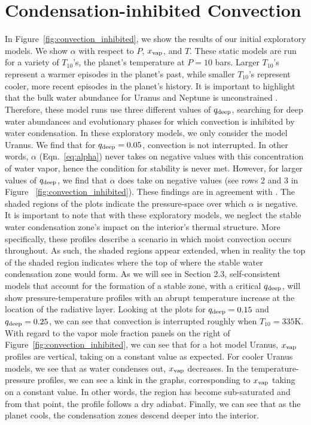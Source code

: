 \documentclass[11pt]{ucscthesisbs}
\begin{document}
\section{Condensation-inhibited Convection}
In Figure~\ref{fig:convection_inhibited}, we show the results of our initial exploratory models. We show $\alpha$ with respect to $P$, $x_{\rm vap}$, and $T$. These static models are run for a variety of $T_{10}$'s, the planet's temperature at $P=10$ bars. Larger $T_{10}$'s represent a warmer episodes in the planet's past, while smaller $T_{10}$'s represent cooler, more recent episodes in the planet's history.  It is important to highlight that the bulk water abundance for Uranus and Neptune is unconstrained \citep{guillot_1995}. Therefore, these model runs use three different values of $q_{\rm deep}$, searching for deep water abundances and evolutionary phases for which convection is inhibited by water condensation. In these exploratory models, we only consider the model Uranus. We find that for $q_{\rm deep} = 0.05$, convection is not interrupted. In other words, $\alpha$ (Eqn.~\ref{eq:alpha})  never takes on negative values with this concentration of water vapor, hence the condition for stability is never met. However, for larger values of $q_{\rm deep}$, we find that $\alpha$ does take{} on negative values (see rows 2 and 3 in Figure ~\ref{fig:convection_inhibited}). These findings are in agreement with \citep{friedson_2017,leconte_2017}. The shaded regions of the plots indicate the pressure-space over which $\alpha$ is negative. It is important to note that with these exploratory models, we neglect the stable water condensation zone's impact on the interior's thermal structure. More specifically, these profiles describe a scenario in which moist convection occurs throughout. As such, the shaded regions appear extended, when in reality the top of the shaded region indicates where the top of where the stable water condensation zone would form. As we will see in Section 2.3, self-consistent models that account for the formation of a stable zone, with a critical $q_{\rm deep}$, will show pressure-temperature profiles with an abrupt temperature increase at the location of the radiative layer. Looking at the plots for $q_{\rm deep} = 0.15$ and $q_{\rm deep} = 0.25$, we can see that convection is interrupted roughly when $T_{10} = 335$K. With regard to the vapor mole fraction panels on the right of Figure~\ref{fig:convection_inhibited}, we can see that for a hot model Uranus, $x_{\rm vap}$ profiles are vertical, taking on a constant value as expected. For cooler Uranus models, we see that as water condenses out, $x_{\rm vap}$ decreases. In the temperature-pressure profiles, we can see a kink in the graphs, corresponding to $x_{\rm vap}$ taking on a constant value. In other words, the region has become sub-saturated and from that point, the profile follows a dry adiabat. Finally, we can see that as the planet cools, the condensation zones descend deeper into the interior.
\end{document}

